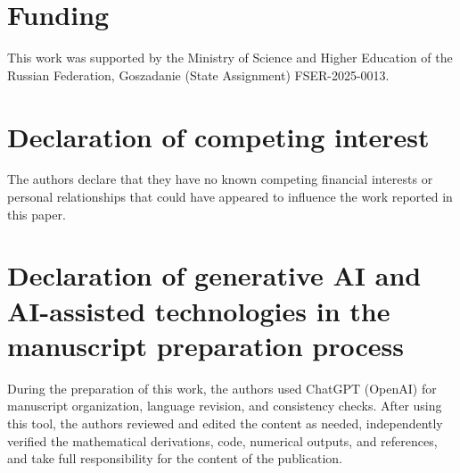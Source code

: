 \documentclass[preprint,11pt]{elsarticle}
\begin{document}
\section*{Funding}
This work was supported by the Ministry of Science and Higher Education of the Russian Federation, Goszadanie (State Assignment) FSER-2025-0013.

\section*{Declaration of competing interest}
The authors declare that they have no known competing financial interests or personal relationships that could have appeared to influence the work reported in this paper.

\section*{Declaration of generative AI and AI-assisted technologies in the manuscript preparation process}
During the preparation of this work, the authors used ChatGPT (OpenAI) for manuscript organization, language revision, and consistency checks. After using this tool, the authors reviewed and edited the content as needed, independently verified the mathematical derivations, code, numerical outputs, and references, and take full responsibility for the content of the publication.
\end{document}
